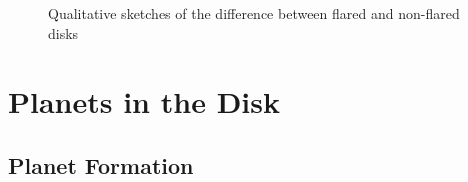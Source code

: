     \\ 
    \\
    \\
    \\ 
    \\
    \begin{figure}[h!]
      \centering
      \begin{minipage}{.5\linewidth}
        \centering
      \end{minipage}%
      \begin{minipage}{.5\linewidth}
        \centering
      \end{minipage}
      \caption{Qualitative sketches of the difference between flared and 
        non-flared disks
      }
      \label{fig:flaring_disk}
    \end{figure}
  
  \newpage
  \section{Planets in the Disk}

    \subsection{Planet Formation}

